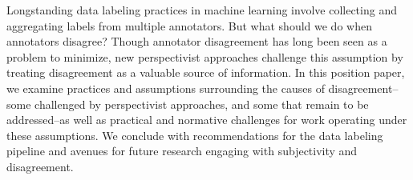 Longstanding data labeling practices in machine learning involve collecting and aggregating labels from multiple annotators. But what should we do when annotators disagree? Though annotator disagreement has long been seen as a problem to minimize, new perspectivist approaches challenge this assumption by treating disagreement as a valuable source of information. In this position paper, we examine practices and assumptions surrounding the causes of disagreement--some challenged by perspectivist approaches, and some that remain to be addressed--as well as practical and normative challenges for work operating under these assumptions. We conclude with recommendations for the data labeling pipeline and avenues for future research engaging with subjectivity and disagreement.